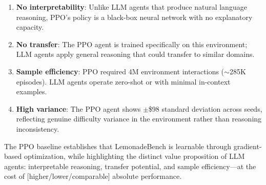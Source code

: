 \begin{enumerate}[noitemsep]
    \item \textbf{No interpretability}: Unlike LLM agents that produce natural language reasoning, PPO's policy is a black-box neural network with no explanatory capacity.
    
    \item \textbf{No transfer}: The PPO agent is trained specifically on this environment; LLM agents apply general reasoning that could transfer to similar domains.
    
    \item \textbf{Sample efficiency}: PPO required 4M environment interactions ($\sim$285K episodes). LLM agents operate zero-shot or with minimal in-context examples.
    
    \item \textbf{High variance}: The PPO agent shows $\pm$\$98 standard deviation across seeds, reflecting genuine difficulty variance in the environment rather than reasoning inconsistency.
\end{enumerate}

The PPO baseline establishes that LemonadeBench is learnable through gradient-based optimization, while highlighting the distinct value proposition of LLM agents: interpretable reasoning, transfer potential, and sample efficiency---at the cost of [higher/lower/comparable] absolute performance.




